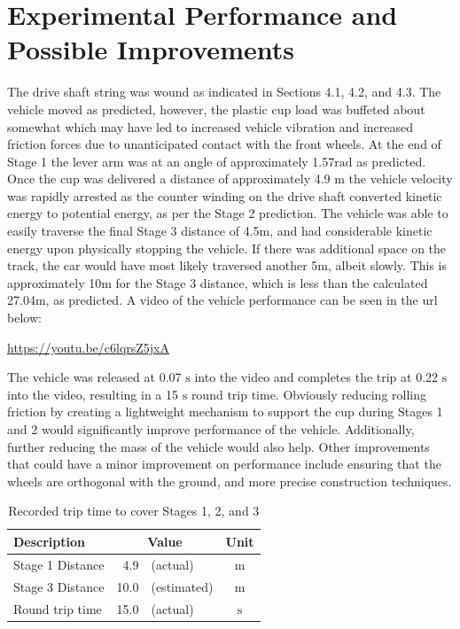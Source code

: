 \documentclass[a4paper]{article}
\begin{document}
\section{Experimental Performance and Possible Improvements}
The drive shaft string was wound as indicated in Sections 4.1, 4.2, and 4.3. The vehicle moved as predicted, however, the plastic cup load was buffeted about somewhat which may have led to increased vehicle vibration and increased friction forces due to unanticipated contact with the front wheels. At the end of Stage 1 the lever arm was at an angle of approximately 1.57$\si{\radian}$ as predicted. Once the cup was delivered a distance of approximately 4.9 $\si{\meter}$ the vehicle velocity was rapidly arrested as the counter winding on the drive shaft converted kinetic energy to potential energy, as per the Stage 2 prediction. The vehicle was able to easily traverse the final Stage 3 distance of 4.5$\si{\meter}$, and had considerable kinetic energy upon physically stopping the vehicle. If there was additional space on the track, the car would have most likely traversed another 5$\si{\meter}$, albeit slowly. This is approximately 10$\si{\meter}$ for the Stage 3 distance, which is less than the calculated 27.04$\si{\meter}$, as predicted. A video of the vehicle performance can be seen in the url below:
\begin{center}
	\url{https://youtu.be/c6lqrsZ5jxA}
\end{center}

The vehicle was released at 0.07 $\si{\second}$ into the video and completes the trip at 0.22 $\si{\second}$ into the video, resulting in a 15 $\si{\second}$ round trip time. Obviously reducing rolling friction by creating a lightweight mechanism to support the cup during Stages 1 and 2 would significantly improve performance of the vehicle. Additionally, further reducing the mass of the vehicle would also help. Other improvements that could have a minor improvement on performance include ensuring that the wheels are orthogonal with the ground, and more precise construction techniques.

\vspace{1cm}

\begin{table}[h]
	\centering
	\caption{Recorded trip time to cover Stages 1, 2, and 3}
	\begin{tabular}{lrlc}
		\toprule
		Description & \multicolumn{2}{c}{Value} & Unit  \\
		\midrule
		Stage 1 Distance & ~4.9 & (actual) & $\si{\meter}$ \\
		Stage 3 Distance & 10.0 & (estimated) & $\si{\meter}$ \\
		Round trip time & 15.0 & (actual) & $\si{\second}$ \\
		\bottomrule
	\end{tabular}
\end{table}
\end{document}
